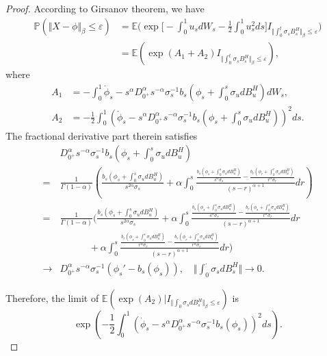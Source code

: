 \documentclass[preprint,12pt]{elsarticle}
\theoremstyle{definition}  %
\theoremstyle{plain}  %
\begin{document}
\begin{proof}
According to Girsanov theorem, we have
	\begin{align*}
\mathbb{P}(\Vert X-\phi\Vert_\beta \leq \varepsilon)
&=\mathbb{E}\Big(\exp\Big[ -\int_0^1 u_s dW_s - \frac{1}{2} \int_0^1 u_s^2 ds\Big] I_{\Vert \int_0^t \sigma_s B^H_s\Vert_\beta \leq \varepsilon}\Big) \\
  &=	\mathbb{E}\left(\exp(A_1+A_2)I_{\Vert \int_0^t \sigma_s B^H_s\Vert_\beta \leq \varepsilon}\right),
\end{align*}
where
\begin{align*}
	A_1 &= -\int_0^1  \dot{\phi}_s-s^{\alpha}D_{0^+}^\alpha s^{-\alpha}  \sigma_s^{-1} b_s\left(\phi_s+\int_0^s \sigma_u dB^H_u\right)dW_s,\\
 	A_2 &= -\frac{1}{2}\int_0^1 \left(\dot{\phi}_s-s^{\alpha}D_{0^+}^\alpha s^{-\alpha}  \sigma_s^{-1} b_s\left(\phi_s+\int_0^s \sigma_u dB^H_u\right)\right)^2 ds.
\end{align*}
The fractional derivative part therein satisfies
\begin{align*}
	&D_{0^+}^\alpha s^{-\alpha}  \sigma_s^{-1} b_s\left(\phi_s+\int_0^s \sigma_u dB^H_u\right)\\
	=&\frac{1}{\Gamma(1-\alpha)}\left(\frac{b_s(\phi_s+\int_0^s \sigma_u dB^H_u)}{s^{2\alpha}\sigma_s}+\alpha\int_0^s \frac{\frac{b_s(\phi_s+\int_0^s \sigma_udB^H_u)}{s^\alpha \sigma_s}-\frac{b_r(\phi_r+\int_0^r \sigma_u dB^H_u)}{r^\alpha \sigma_r}}{(s-r)^{\alpha+1}}dr \right)\\
	=&\frac{1}{\Gamma(1-\alpha)}\Bigg(\frac{b_s(\phi_s+\int_0^s \sigma_u dB^H_u)}{s^{2\alpha}\sigma_s}+\alpha\int_0^s \frac{\frac{b_s(\phi_s+\int_0^s \sigma_udB^H_u)}{s^\alpha \sigma_s}-\frac{b_r(\phi_s+\int_0^s \sigma_u dB^H_u)}{r^\alpha \sigma_r}}{(s-r)^{\alpha+1}}dr   \\
	&\quad\quad\quad +\alpha\int_0^s \frac{\frac{b_r(\phi_s+\int_0^s \sigma_udB^H_u)}{r^\alpha \sigma_r}-\frac{b_r(\phi_r+\int_0^r \sigma_u dB^H_u)}{r^\alpha \sigma_r}}{(s-r)^{\alpha+1}}dr  \Bigg)\\
	\to & D_{0^+}^\alpha s^{-\alpha}  \sigma_s^{-1}\left(\phi_s' - b_s\left(\phi_s\right)\right),\quad   \Vert  \int_0^\cdot \sigma_s d B^H_s \Vert  \to 0.
\end{align*}


Therefore, the limit of $\mathbb{E}(\exp(A_2)| I_{\Vert \int_0^\cdot \sigma_s dB^H_s\Vert_\beta \leq \varepsilon})$ is 
\begin{equation*}
	\exp\left(-\frac{1}{2}\int_0^1 \left(\dot{\phi}_s-s^{\alpha}D_{0^+}^\alpha s^{-\alpha}  \sigma_s^{-1}b_s\left(\phi_s\right)\right)^2 ds\right).
\end{equation*} 


\end{proof}
\end{document}
